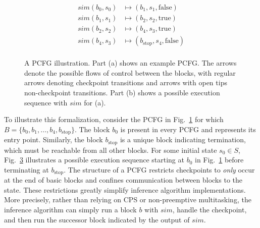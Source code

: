 \documentclass[runningheads]{llncs}
\begin{document}
\begin{figure}[tb]
  \centering
  \begin{subfigure}[c]{0.55\textwidth}
    \centering
    \hspace{1cm}
    \normalsize
    \caption{}
    \label{fig:pcfg}
  \end{subfigure}
  \hfill
  \begin{subfigure}[c]{0.4\textwidth}
    \[
      \begin{aligned}
        \mathit{sim}(b_0,s_0)& \mapsto (b_1,s_1,\text{false})           \\
        \mathit{sim}(b_1,s_1)& \mapsto (b_2,s_2,\text{true})            \\
        \mathit{sim}(b_2,s_2)& \mapsto (b_4,s_3,\text{true})            \\
        \mathit{sim}(b_4,s_3)& \mapsto (b_\text{stop},s_4,\text{false}) \\
      \end{aligned}
    \]
    \caption{}
    \label{fig:pcfgexample}
  \end{subfigure}
  \caption{%
    A PCFG illustration.
    Part (a) shows an example PCFG.
    The arrows denote the possible flows of control between the blocks, with regular arrows denoting checkpoint transitions and arrows with open tips non-checkpoint transitions.
    Part (b) shows a possible execution sequence with $\mathit{sim}$ for (a).
  }
\end{figure}

To illustrate this formalization, consider the PCFG in Fig.~\ref{fig:pcfg} for which $B = \{b_0,b_1,\ldots,b_4,b_\text{stop}\}$.
The block $b_0$ is present in every PCFG and represents its entry point.
Similarly, the block $b_\text{stop}$ is a unique block indicating termination, which must be reachable from all other blocks.
For some initial state $s_0 \in S$, Fig.~\ref{fig:pcfgexample} illustrates a possible execution sequence starting at $b_0$ in Fig.~\ref{fig:pcfg} before terminating at $b_\text{stop}$.
The structure of a PCFG restricts checkpoints to \emph{only} occur at the end of basic blocks and confines communication between blocks to the state.
These restrictions greatly simplify inference algorithm implementations.
More precisely, rather than relying on CPS or non-preemptive multitasking, the inference algorithm can simply run a block $b$ with $\mathit{sim}$, handle the checkpoint, and then run the successor block indicated by the output of $\mathit{sim}$.
\end{document}
